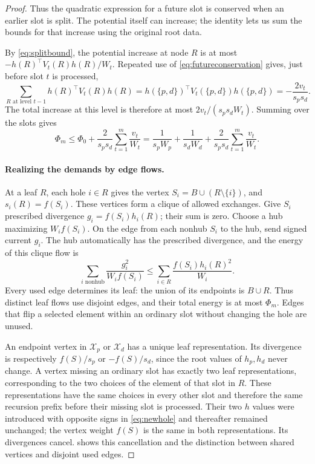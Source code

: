 \documentclass[11pt]{article}
\theoremstyle{definition}
\begin{document}
\begin{proof}
Thus the quadratic expression for a future slot is conserved when an
earlier slot is split.  The potential itself can increase; the identity
lets us sum the bounds for that increase using the original root data.

By \eqref{eq:splitbound}, the potential increase at node $R$ is at most
$-h(R)^\top V_t(R)h(R)/W_t$.  Repeated use of
\eqref{eq:futureconservation} gives, just before slot $t$ is processed,
\[
 \sum_{R\text{ at level }t-1}h(R)^\top V_t(R)h(R)
 =h(\{p,d\})^\top V_t(\{p,d\})h(\{p,d\})
 =-\frac{2v_t}{s_ps_d}.
\]
The total increase at this level is therefore at most
$2v_t/(s_ps_dW_t)$.  Summing over the slots gives
\begin{equation}\label{eq:potentialbound}
 \Phi_m\le\Phi_0+\frac2{s_ps_d}\sum_{t=1}^m\frac{v_t}{W_t}
 =\frac1{s_pW_p}+\frac1{s_dW_d}
             +\frac2{s_ps_d}\sum_{t=1}^m\frac{v_t}{W_t}.
\end{equation}

\paragraph{Realizing the demands by edge flows.}
At a leaf $R$, each hole $i\in R$ gives the vertex
$S_i=B\cup(R\setminus\{i\})$, and $s_i(R)=f(S_i)$.  These vertices
form a clique of allowed exchanges.  Give $S_i$ prescribed divergence
$g_i=f(S_i)h_i(R)$; their sum is zero.  Choose a hub maximizing
$W_if(S_i)$.  On the edge from each nonhub $S_i$ to the hub, send signed
current $g_i$.  The hub automatically has the prescribed divergence,
and the energy of this clique flow is
\[
 \sum_{i\text{ nonhub}}\frac{g_i^2}{W_if(S_i)}
 \le\sum_{i\in R}\frac{f(S_i)h_i(R)^2}{W_i}.
\]
Every used edge determines its leaf: the union of its endpoints is
$B\cup R$.  Thus distinct leaf flows use disjoint edges, and their total
energy is at most $\Phi_m$.  Edges that flip a selected element within
an ordinary slot without changing the hole are unused.

An endpoint vertex in $\mathcal X_p$ or $\mathcal X_d$ has a unique
leaf representation.  Its divergence is respectively $f(S)/s_p$ or
$-f(S)/s_d$, since the root values of $h_p,h_d$ never change.
A vertex missing an ordinary slot has exactly two leaf representations,
corresponding to the two choices of the element of that slot in $R$.
These representations have the same choices in every other slot and
therefore the same recursion prefix before their missing slot is processed.
Their two $h$ values were introduced with opposite signs in
\eqref{eq:newhole} and thereafter remained unchanged; the vertex weight
$f(S)$ is the same in both representations.  Its divergences cancel.
 shows this cancellation and the distinction
between shared vertices and disjoint used edges.


\end{proof}
\end{document}

